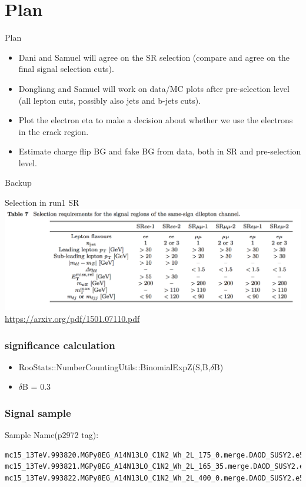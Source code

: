 \documentclass[mathserif,serif]{beamer}
\begin{document}
\section{Plan}
\begin{frame}{Plan}
\begin{itemize}
\item Dani and Samuel will agree on the SR selection (compare and agree on the final signal selection cuts).
\item Dongliang and Samuel will work on data/MC plots after pre-selection level (all lepton cuts, possibly also jets and b-jets cuts).
\item Plot the electron eta to make a decision about whether we use the electrons in the crack region.
\item Estimate charge flip BG and fake BG from data, both in SR and pre-selection level.
\end{itemize}
\end{frame}

\begin{frame}
\begin{center}
\huge
Backup
\end{center}
\end{frame}

\begin{frame}{Selection in run1 SR}
\includegraphics[width=\textwidth]{data/photo/SRcutrun1.png} \\
\url{https://arxiv.org/pdf/1501.07110.pdf}
\end{frame}

\begin{frame}
\frametitle{significance calculation}
\begin{itemize}
\item RooStats::NumberCountingUtils::BinomialExpZ(S,B,$\delta$B)
\item $\delta$B = 0.3
\end{itemize}
\end{frame}

\begin{frame}[fragile]
\frametitle{Signal sample}
\small
Sample Name(p2972 tag):
\tiny
\begin{verbatim}
mc15_13TeV.993820.MGPy8EG_A14N13LO_C1N2_Wh_2L_175_0.merge.DAOD_SUSY2.e5678_a766_a821_r7676_p2949_p2972
mc15_13TeV.993821.MGPy8EG_A14N13LO_C1N2_Wh_2L_165_35.merge.DAOD_SUSY2.e5678_a766_a821_r7676_p2949_p2972
mc15_13TeV.993822.MGPy8EG_A14N13LO_C1N2_Wh_2L_400_0.merge.DAOD_SUSY2.e5678_a766_a821_r7676_p2949_p2972
\end{verbatim}
\end{frame}
\end{document}
